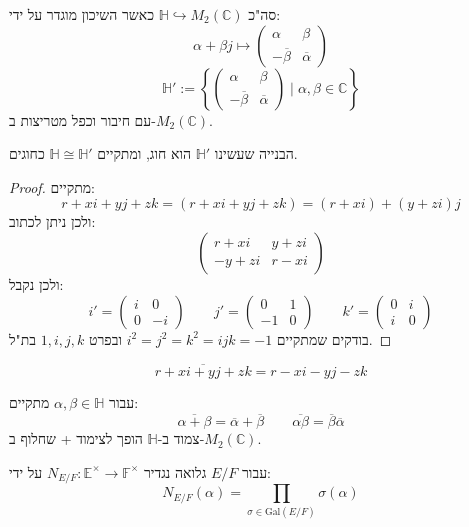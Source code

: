 \documentclass{tstextbook}
\begin{document}
סה"כ \(\mathbb{H}\hookrightarrow M_{2}(\mathbb{C})\) כאשר השיכון מוגדר על ידי:
$$\alpha+\beta j\mapsto \begin{pmatrix}\alpha & \beta \\-\overline{\beta} & \overline{\alpha} 
\end{pmatrix}$$$$\mathbb{H}' :=\left\{ \begin{pmatrix}\alpha & \beta \\-\overline{\beta} & \overline{\alpha} 
\end{pmatrix} \mid \alpha,\beta \in \mathbb{C}\right\}$$
עם חיבור וכפל מטריצות ב-\(M_{2}(\mathbb{C})\).

\begin{proposition}
הבנייה שעשינו \(\mathbb{H}'\) הוא חוג, ומתקיים \(\mathbb{H}\cong\mathbb{H'}\) כחוגים.

\end{proposition}
\begin{proof}
מתקיים:
$$r+x i + y j + zk=(r+x i+yj+zk)=(r+x i)+(y+z i)j$$
ולכן ניתן לכתוב:
$$\begin{pmatrix}r+x i & y + z i \\-y+zi & r-x i
\end{pmatrix}$$
ולכן נקבל:
$$i'=\begin{pmatrix}i & 0 \\0 & -i\end{pmatrix}\qquad j'=\begin{pmatrix}0 & 1 \\-1 & 0\end{pmatrix}\qquad k'=\begin{pmatrix}0 & i \\i & 0
\end{pmatrix}$$
בודקים שמתקיים \(i^{2}=j^{2}=k^{2}=ijk=-1\) ובפרט \(1,i,j,k\) בת"ל.

\end{proof}
\begin{definition}[צמוד]
$$\overline{r+x i + yj + zk}=r-x i - yj - zk $$

\end{definition}
\begin{proposition}
עבור \(\alpha,\beta \in \mathbb{H}\) מתקיים:
$$\overline{\alpha+\beta} =\overline{\alpha} +\overline{\beta} \qquad \overline{\alpha \beta} =\overline{\beta} \overline{\alpha} $$
צמוד ב-\(\mathbb{H}\) הופך לצימוד + שחלוף ב-\(M_{2}(\mathbb{C})\).

\end{proposition}
\begin{reminder}
עבור \(E / F\) גלואה נגדיר \(N_{E / F}: \mathbb{E}^{\times}\to \mathbb{F}^{\times}\) על ידי:
$$N_{E / F}(\alpha)=\prod_{\sigma \in \mathrm{Gal}(E / F)} \sigma(\alpha)$$

\end{reminder}
\end{document}
